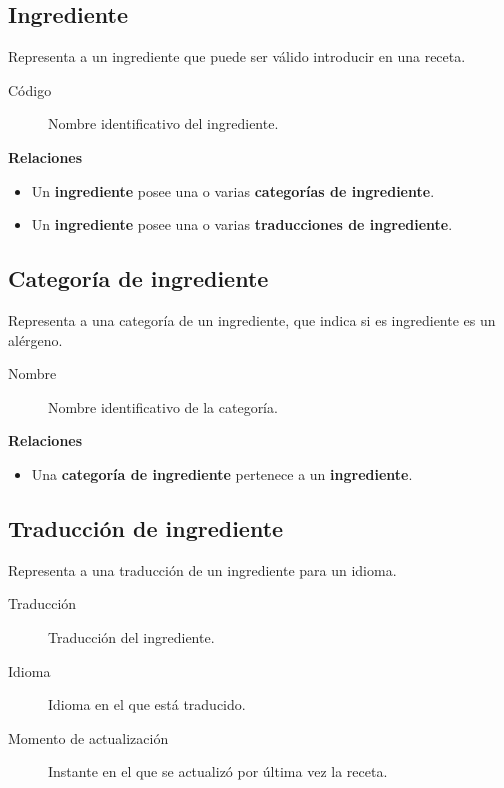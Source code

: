 \subsection{Ingrediente}

Representa a un ingrediente que puede ser válido introducir en una receta.

\begin{description}
\item[Código] Nombre identificativo del ingrediente.
\end{description}


\textbf{Relaciones}
\begin{itemize}
\item Un \textbf{ingrediente} posee una o varias \textbf{categorías de
ingrediente}.
\item Un \textbf{ingrediente} posee una o varias \textbf{traducciones de
ingrediente}.
\end{itemize}


\subsection{Categoría de ingrediente}

Representa a una categoría de un ingrediente, que indica si es ingrediente
es un alérgeno.

\begin{description}
\item[Nombre] Nombre identificativo de la categoría.
\end{description}


\textbf{Relaciones}
\begin{itemize}
\item Una \textbf{categoría de ingrediente} pertenece a un \textbf{ingrediente}.
\end{itemize}


\subsection{Traducción de ingrediente}

Representa a una traducción de un ingrediente para un idioma.

\begin{description}
\item[Traducción] Traducción del ingrediente.
\item[Idioma] Idioma en el que está traducido.
\item[Momento de actualización] Instante en el que se actualizó por última vez
la receta.
\end{description}


